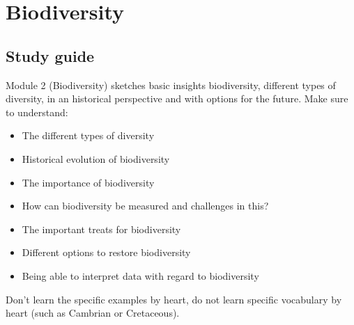 \documentclass[../summary.tex]{subfiles}
\begin{document}
	
	\section{Biodiversity}
	
	\subsection{Study guide}
	
	Module 2 (Biodiversity) sketches basic insights biodiversity, different types of diversity, in an historical perspective and with options for the future. Make sure to understand:
	\begin{itemize}
		\item The different types of diversity
		\item Historical evolution of biodiversity
		\item The importance of biodiversity
		\item How can biodiversity be measured and challenges in this?
		\item The important treats for biodiversity
		\item Different options to restore biodiversity
		\item Being able to interpret data with regard to biodiversity
	\end{itemize} 
	
	Don’t learn the specific examples by heart, do not learn specific vocabulary by heart (such as Cambrian or Cretaceous).
	\\
	
\end{document}
